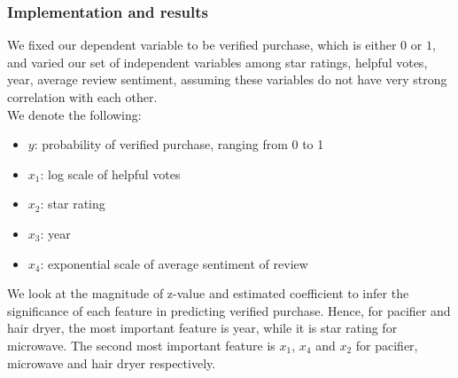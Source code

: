 \documentclass[reqno]{article}
\theoremstyle{definition}
\theoremstyle{definition}
\theoremstyle{remark}
\begin{document}
\subsubsection{Implementation and results}
We fixed our dependent variable to be verified purchase, which is either $0$ or $1$, and varied our set of independent variables among star ratings, helpful votes, year, average review sentiment, assuming these variables do not have very strong correlation with each other. \\
We denote the following:
\begin{itemize}
    \item $y$: probability of verified purchase, ranging from 0 to 1
    \item $x_1$: log scale of helpful votes
    \item $x_2$: star rating
    \item $x_3$: year
    \item $x_4$: exponential scale of average sentiment of review
\end{itemize}
We look at the magnitude of z-value and estimated coefficient to infer the significance of each feature in predicting verified purchase. Hence,
for pacifier and hair dryer, the most important feature is year, while it is star rating for microwave. The second most important feature is $x_1$, $x_4$ and $x_2$ for pacifier, microwave and hair dryer respectively.
\clearpage
\end{document}
